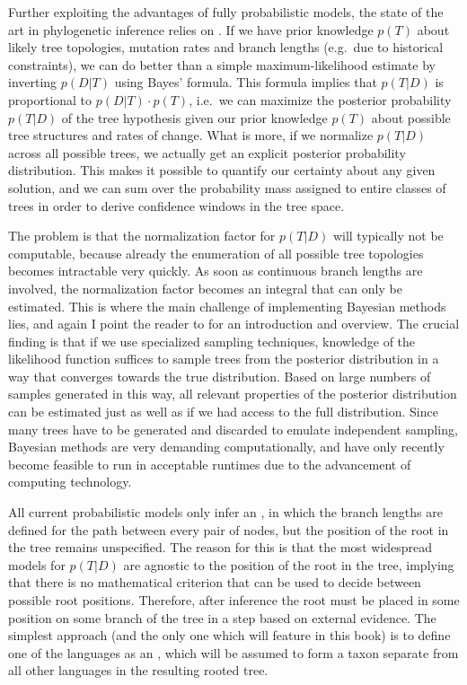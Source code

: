 Further exploiting the advantages of fully probabilistic models, the state of the art in phylogenetic inference relies on . If we have prior knowledge $p(T)$ about likely tree topologies, mutation rates and branch lengths (e.g.\ due to historical constraints), we can do better than a simple maximum-likelihood estimate by inverting $p(D|T)$ using Bayes' formula. This formula implies that $p(T|D)$ is proportional to $p(D|T)\cdot p(T)$, i.e.\ we can maximize the posterior probability $p(T|D)$ of the tree hypothesis given our prior knowledge $p(T)$ about possible tree structures and rates of change. What is more, if we normalize $p(T|D)$ across all possible trees, we actually get an explicit posterior probability distribution. This makes it possible to quantify our certainty about any given solution, and we can sum over the probability mass assigned to entire classes of trees in order to derive confidence windows in the tree space.

The problem is that the normalization factor for $p(T|D)$ will typically not be computable, because already the enumeration of all possible tree topologies becomes intractable very quickly. As soon as continuous branch lengths are involved, the normalization factor becomes an integral that can only be estimated. This is where the main challenge of implementing Bayesian methods lies, and again I point the reader to \citet[Ch. 18]{felsenstein2004} for an introduction and overview. The crucial finding is that if we use specialized sampling techniques, knowledge of the likelihood function suffices to sample trees from the posterior distribution in a way that converges towards the true distribution. Based on large numbers of samples generated in this way, all relevant properties of the posterior distribution can be estimated just as well as if we had access to the full distribution. Since many trees have to be generated and discarded to emulate independent sampling, Bayesian methods are very demanding computationally, and have only recently become feasible to run in acceptable runtimes due to the advancement of computing technology.

All current probabilistic models only infer an \textit{}, in which the branch lengths are defined for the path between every pair of nodes, but the position of the root in the tree remains unspecified. The reason for this is that the most widespread models for $p(T|D)$ are agnostic to the position of the root in the tree, implying that there is no mathematical criterion that can be used to decide between possible root positions. Therefore, after inference the root must  be placed in some position on some branch of the tree in a \textit{} step based on external evidence. The simplest approach (and the only one which will feature in this book) is to define one of the languages as an \textit{}, which will be assumed to form a taxon separate from all other languages in the resulting rooted tree.

